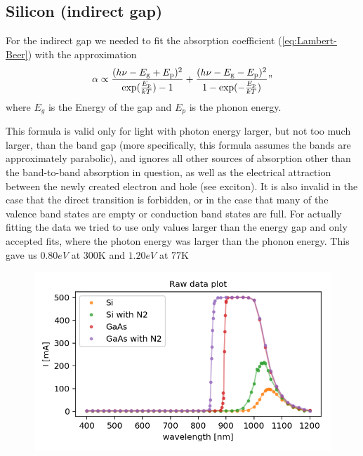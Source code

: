 \documentclass[]{article}
\begin{document}
\subsection{Silicon (indirect gap)}
For the indirect gap we needed to fit the absorption coefficient (\ref{eq:Lambert-Beer}) with the approximation
\begin{equation}
	\alpha \propto {\frac  {(h\nu -E_{{{\text{g}}}}+E_{{{\text{p}}}})^{2}}{\exp({\frac  {E_{{{\text{p}}}}}{kT}})-1}}+{\frac  {(h\nu -E_{{{\text{g}}}}-E_{{{\text{p}}}})^{2}}{1-\exp(-{\frac  {E_{{{\text{p}}}}}{kT}})}}"
\end{equation}
where $E_g$ is the Energy of the gap and $E_p$ is the phonon energy.


This formula is valid only for light with photon energy larger, but not too much larger, than the band gap (more specifically, this formula assumes the bands are approximately parabolic), and ignores all other sources of absorption other than the band-to-band absorption in question, as well as the electrical attraction between the newly created electron and hole (see exciton). It is also invalid in the case that the direct transition is forbidden, or in the case that many of the valence band states are empty or conduction band states are full.\cite{absformular}
For actually fitting the data we tried to use only values larger than the energy gap and only accepted fits, where the photon energy was larger than the phonon energy. This gave us $0.80eV$ at 300K and $1.20eV$ at 77K


\begin{figure}
	\centering
	\includegraphics[width=0.7\linewidth]{"Plots/raw data"}
	\caption{}
	\label{fig:raw-data}
\end{figure}





\end{document}
